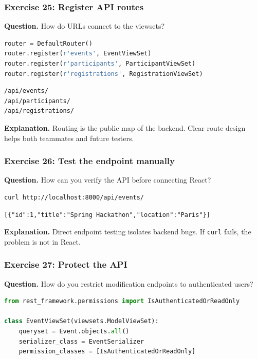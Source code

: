 \documentclass[11pt,a4paper]{article}
\begin{document}
\subsubsection*{Exercise 25: Register API routes}
\textbf{Question.} How do URLs connect to the viewsets?

\begin{lstlisting}[style=code, language=Python]
router = DefaultRouter()
router.register(r'events', EventViewSet)
router.register(r'participants', ParticipantViewSet)
router.register(r'registrations', RegistrationViewSet)
\end{lstlisting}

\begin{lstlisting}[style=terminal]
/api/events/
/api/participants/
/api/registrations/
\end{lstlisting}

\textbf{Explanation.} Routing is the public map of the backend. Clear route design helps both teammates and future testers.

\subsubsection*{Exercise 26: Test the endpoint manually}
\textbf{Question.} How can you verify the API before connecting React?

\begin{lstlisting}[style=terminal]
curl http://localhost:8000/api/events/
\end{lstlisting}

\begin{lstlisting}[style=terminal]
[{"id":1,"title":"Spring Hackathon","location":"Paris"}]
\end{lstlisting}

\textbf{Explanation.} Direct endpoint testing isolates backend bugs. If \texttt{curl} fails, the problem is not in React.

\subsubsection*{Exercise 27: Protect the API}
\textbf{Question.} How do you restrict modification endpoints to authenticated users?

\begin{lstlisting}[style=code, language=Python]
from rest_framework.permissions import IsAuthenticatedOrReadOnly

class EventViewSet(viewsets.ModelViewSet):
    queryset = Event.objects.all()
    serializer_class = EventSerializer
    permission_classes = [IsAuthenticatedOrReadOnly]
\end{lstlisting}
\end{document}
